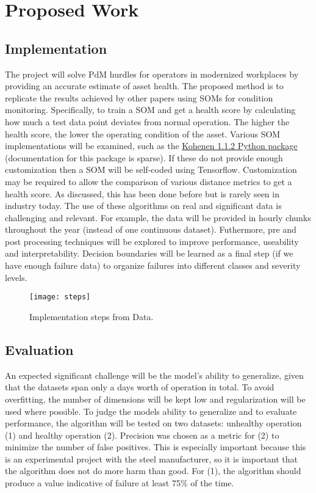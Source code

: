 \section{Proposed Work}
\subsection{Implementation}

The project will solve PdM hurdles for operators in modernized workplaces by providing an accurate estimate of asset health.
The proposed method is to replicate the results achieved by other papers using SOMs for condition monitoring. 
Specifically, to train a SOM and get a health score by calculating how much a test data point deviates from normal operation.
The higher the health score, the lower the operating condition of the asset.
Various SOM implementations will be examined, such as the \href{https://pypi.org/project/kohonen/}{Kohenen 1.1.2 Python package} (documentation for this package is sparse).
If these do not provide enough customization then a SOM will be self-coded using Tensorflow.
Customization may be required to allow the comparison of various distance metrics to get a health score.
As discussed, this has been done before but is rarely seen in industry today.
The use of these algorithms on real and significant data is challenging and relevant.
For example, the data will be provided in hourly chunks throughout the year (instead of one continuous dataset).
Futhermore, pre and post processing techniques will be explored to improve performance, useability and interpretability.
Decision boundaries will be learned as a final step (if we have enough failure data) to organize failures into different classes and severity levels.

\begin{figure}[!h]
    \texttt{[image: steps]}
    \centering
    \label{fig:steps}
    \caption{Implementation steps from Data.}
\end{figure}

\subsection{Evaluation}

An expected significant challenge will be the model's ability to generalize, given that the datasets span only a days worth of operation in total.
To avoid overfitting, the number of dimensions will be kept low and regularization will be used where possible.
To judge the models ability to generalize and to evaluate performance, the algorithm will be tested on two datasets: unhealthy operation (1) and healthy operation (2).
Precision was chosen as a metric for (2) to minimize the number of false positives.
This is especially important because this is an experimental project with the steel manufacturer, so it is important that the algorithm does not do more harm than good.
For (1), the algorithm should produce a value indicative of failure at least 75\% of the time.


